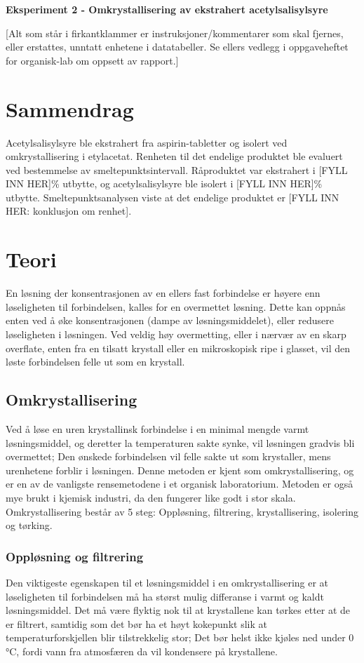\begin{center} %
\LARGE{\textbf{Eksperiment 2 - Omkrystallisering av ekstrahert acetylsalisylsyre}}
\end{center}
[Alt som står i firkantklammer er instruksjoner/kommentarer som skal fjernes, eller erstattes, unntatt enhetene i datatabeller. Se ellers vedlegg i oppgaveheftet for organisk-lab om oppsett av rapport.]
\section*{Sammendrag}
Acetylsalisylsyre ble ekstrahert fra aspirin-tabletter og isolert ved omkrystallisering i etylacetat. Renheten til det endelige produktet ble evaluert ved bestemmelse av smeltepunktsintervall. Råproduktet var ekstrahert i [FYLL INN HER]\% utbytte, og acetylsalisylsyre ble isolert i [FYLL INN HER]\% utbytte. Smeltepunktsanalysen viste at det endelige produktet er [FYLL INN HER: konklusjon om renhet].


\section{Teori}
En løsning der konsentrasjonen av en ellers fast forbindelse er høyere enn løseligheten til forbindelsen, kalles for en overmettet løsning\cite{raymond2013general}. Dette kan oppnås enten ved å øke konsentrasjonen (dampe av løsningsmiddelet), eller redusere løseligheten i løsningen. Ved veldig høy overmetting, eller i nærvær av en skarp overflate, enten fra en tilsatt krystall eller en mikroskopisk ripe i glasset, vil den løste forbindelsen felle ut som en krystall.

\subsection{Omkrystallisering}
Ved å løse en uren krystallinsk forbindelse i en minimal mengde varmt løsningsmiddel, og deretter la temperaturen sakte synke, vil løsningen gradvis bli overmettet; Den ønskede forbindelsen vil felle sakte ut som krystaller, mens urenhetene forblir i løsningen\cite{harwood1999experimental}. Denne metoden er kjent som omkrystallisering, og er en av de vanligste rensemetodene i et organisk laboratorium. Metoden er også mye brukt i kjemisk industri, da den fungerer like godt i stor skala. 
Omkrystallisering består av 5 steg: Oppløsning, filtrering, krystallisering, isolering og tørking.

\subsubsection{Oppløsning og filtrering}
Den viktigeste egenskapen til et løsningsmiddel i en omkrystallisering er at løseligheten til forbindelsen må ha størst mulig differanse i varmt og kaldt løsningsmiddel\cite{harwood1999experimental}. Det må være flyktig nok til at krystallene kan tørkes etter at de er filtrert, samtidig som det bør ha et høyt kokepunkt slik at temperaturforskjellen blir tilstrekkelig stor; Det bør helst ikke kjøles ned under 0 \si{\celsius}, fordi vann fra atmosfæren da vil kondensere på krystallene. 

